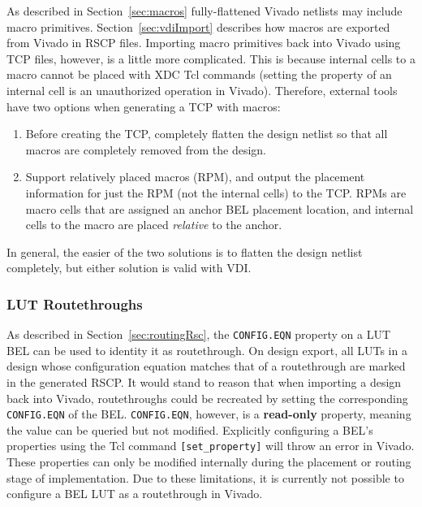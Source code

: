 As described in Section~\ref{sec:macros} fully-flattened Vivado netlists may
include macro primitives. Section~\ref{sec:vdiImport} describes how macros
are exported from Vivado in RSCP files. Importing macro primitives
back into Vivado using TCP files, however, is a little more complicated. This
is because internal cells to a macro cannot be placed with XDC Tcl commands
(setting the property of an internal cell is an unauthorized operation in
Vivado). Therefore, external tools have two options when generating a TCP with
macros:

\begin{enumerate}
  \item Before creating the TCP, completely flatten the design netlist so that
  all macros are completely removed from the design.
  
  \item Support relatively placed macros (RPM), and output the placement
  information for just the RPM (not the internal cells) to the TCP. RPMs are
  macro cells that are assigned an anchor BEL placement location, and internal
  cells to the macro are placed \textit{relative} to the anchor.
\end{enumerate}

\noindent In general, the easier of the two solutions is to flatten the
design netlist completely, but either solution is valid with VDI. 

\subsubsection{LUT Routethroughs} \label{sec:routethroughReplace}

As described in Section~\ref{sec:routingRsc}, the \texttt{CONFIG.EQN} property on a
LUT BEL can be used to identity it as routethrough. On design export, all LUTs
in a design whose configuration equation matches that of a routethrough are
marked in the generated RSCP. It would stand to reason that when importing a
design back into Vivado, routethroughs could be recreated by setting the
corresponding \texttt{CONFIG.EQN} of the BEL. \texttt{CONFIG.EQN}, however, is
a \textbf{read-only} property, meaning the value can be queried but not
modified. Explicitly configuring a BEL's properties using the Tcl command
\texttt{[set\_property]} will throw an error in Vivado. These properties can
only be modified internally during the placement or routing stage of
implementation. Due to these limitations, it is currently not possible
to configure a BEL LUT as a routethrough in Vivado.

